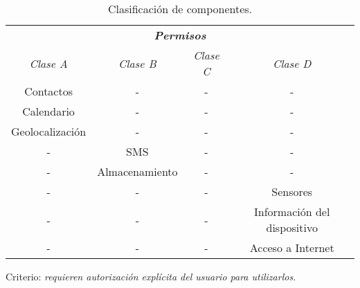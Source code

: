\begin{frame}
  \begin{table}[H]
    \centering
    \begin{small}
	\begin{tabular}{c c c c}
		\hline
		\multicolumn{4}{c}{\emph{\textbf{Permisos}}} \\
		\emph{Clase A} 	& \emph{Clase B}	 & \emph{Clase C}    & \emph{Clase D}\\ \hline \hline
    Contactos    & -    & -    & -\\
    Calendario    & -    & -    & -\\
    Geolocalización    & -    & -    & -\\
    -    & SMS & -    & -\\
    -    & Almacenamiento    & -    & -\\
    -    & -    & -    & Sensores\\
    -    & -    & -    & Información del dispositivo\\
    -    & -    & -    & Acceso a Internet\\ \hline
	\end{tabular}
    \caption{Clasificación de componentes.}
	\end{small}
  \end{table}\pause
  \begin{block}{}\centering
    {Criterio: \emph{requieren autorización explícita del usuario para utilizarlos.}}  
  \end{block}
\end{frame}